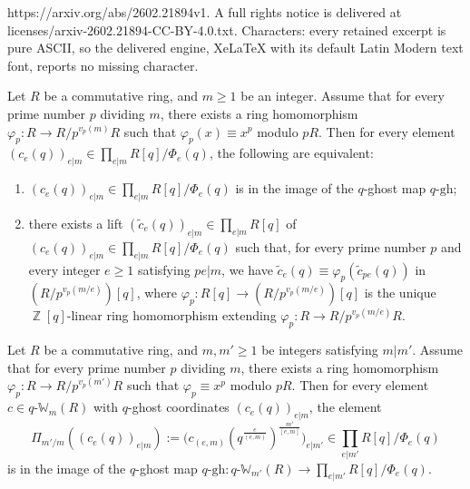\documentclass[10pt,a4paper]{amsart}
\DeclareMathOperator{\Z}{\mathbb{Z}}
\newcommand{\gh}{\mathrm{gh}}
\newcommand{\qWmm}{q\text{-}\mathbb{W}_{m'}}
\newcommand{\qWm}{q\text{-}\mathbb{W}_m}
\renewcommand{\ge}{\geqslant}
\begin{document}
https://arxiv.org/abs/2602.21894v1. A full rights notice is delivered at licenses/arxiv-2602.21894-CC-BY-4.0.txt. Characters: every retained excerpt is pure ASCII, so the delivered engine, XeLaTeX with its default Latin Modern text font, reports no missing character.
\begin{lemma}\label{lemmaqDwork}
    Let $R$ be a commutative ring, and $m \ge 1$ be an integer. Assume that for every prime number $p$ dividing $m$, there exists a ring homomorphism $\varphi_p : R \rightarrow R/p^{v_p(m)}R$ such that $\varphi_p(x) \equiv x^p$ modulo $pR$. Then for every element $(c_e(q))_{e|m} \in \prod_{e|m} R[q]/\Phi_e(q)$, the following are equivalent:
    \begin{enumerate}
        \item $(c_e(q))_{e|m} \in \prod_{e|m} R[q]/\Phi_e(q)$ is in the image of the $q$-ghost map $q$-$\gh$;
        \item there exists a lift $(\tilde{c}_e(q))_{e|m} \in \prod_{e|m} R[q]$ of $(c_e(q))_{e|m} \in \prod_{e|m} R[q]/\Phi_e(q)$ such that, for every prime number $p$ and every integer $e \ge 1$ satisfying $pe|m$, we have $\tilde{c}_e(q) \equiv \varphi_p(\tilde{c}_{pe}(q))$ in $(R/p^{v_p(m/e)})[q]$, where $\varphi_p : R[q] \rightarrow (R/p^{v_p(m/e)})[q]$ is the unique $\Z[q]$-linear ring homomorphism extending $\varphi_p : R \rightarrow R/p^{v_p(m/e)}R$.
    \end{enumerate}
\end{lemma}

\begin{lemma}\label{lemmanormpreserveimageofqghostmap}
    Let $R$ be a commutative ring, and $m,m' \ge 1$ be integers satisfying $m | m'$. Assume that for every prime number $p$ dividing $m$, there exists a ring homomorphism $\varphi_p : R \rightarrow R/p^{v_p(m')}R$ such that $\varphi_p \equiv x^p$ modulo $pR$. Then for every element $c \in \qWm(R)$ with $q$-ghost coordinates $(c_e(q))_{e|m}$,  
    the element $$\Pi_{m'/m}((c_e(q))_{e|m}) := \big(c_{(e,m)}(q^{\frac{e}{(e,m)}})^{\frac{m'}{[e,m]}}\big)_{e|m'} \in \prod_{e|m'} R[q]/\Phi_e(q)$$ is in the image of the $q$-ghost map $q\text{-}\gh : \qWmm(R) \rightarrow \prod_{e | m'} R[q]/\Phi_e(q)$.
\end{lemma}
\end{document}
